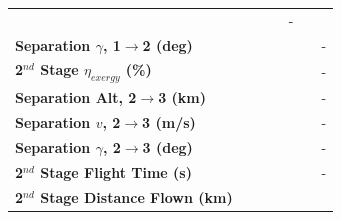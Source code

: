 \begin{table}[ht]
\begin{tabular}{l c c c c c c}
		& \firstsecondSeparationvISPThreeStandardNoReturn
		& \firstsecondSeparationvISPThreeOneHundredFiveNoReturn
		& \firstsecondSeparationvISPThreeOneHundredTenNoReturn
		& -
		\\
		\textbf{Separation $\gamma$, 1$\rightarrow$2 (deg)}
		& \firstsecondSeparationgammaISPThreeNinetyNoReturn
		& \firstsecondSeparationgammaISPThreeNinetyFiveNoReturn
		& \firstsecondSeparationgammaISPThreeStandardNoReturn
		& \firstsecondSeparationgammaISPThreeOneHundredFiveNoReturn
		& \firstsecondSeparationgammaISPThreeOneHundredTenNoReturn
		& -
		\\
		\hline 
		\textbf{2$^{nd}$ Stage $\eta_{exergy}$ (\%)}
		& \textbf{\secondExergyEffISPThreeNinetyNoReturn}
		& \textbf{\secondExergyEffISPThreeNinetyFiveNoReturn}
		& \textbf{\secondExergyEffISPThreeStandardNoReturn}
		& \textbf{\secondExergyEffISPThreeOneHundredFiveNoReturn}
		& \textbf{\secondExergyEffISPThreeOneHundredTenNoReturn}
		& -
		\\
		\textbf{Separation Alt, 2$\rightarrow$3 (km)}
		& \secondthirdSeparationAltISPThreeNinetyNoReturn
		& \secondthirdSeparationAltISPThreeNinetyFiveNoReturn
		& \secondthirdSeparationAltISPThreeStandardNoReturn
		& \secondthirdSeparationAltISPThreeOneHundredFiveNoReturn
		& \secondthirdSeparationAltISPThreeOneHundredTenNoReturn
		& -
		\\
		\textbf{Separation $v$, 2$\rightarrow$3 (m/s)}
		& \secondthirdSeparationvISPThreeNinetyNoReturn
		& \secondthirdSeparationvISPThreeNinetyFiveNoReturn
		& \secondthirdSeparationvISPThreeStandardNoReturn
		& \secondthirdSeparationvISPThreeOneHundredFiveNoReturn
		& \secondthirdSeparationvISPThreeOneHundredTenNoReturn
		& -
		\\
		\textbf{Separation $\gamma$, 2$\rightarrow$3 (deg)}
		& \secondthirdSeparationgammaISPThreeNinetyNoReturn
		& \secondthirdSeparationgammaISPThreeNinetyFiveNoReturn
		& \secondthirdSeparationgammaISPThreeStandardNoReturn
		& \secondthirdSeparationgammaISPThreeOneHundredFiveNoReturn
		& \secondthirdSeparationgammaISPThreeOneHundredTenNoReturn
		& -
		\\
		\textbf{2$^{nd}$ Stage Flight Time (s)}
		& \secondFlightTimeISPThreeNinetyNoReturn
		& \secondFlightTimeISPThreeNinetyFiveNoReturn
		& \secondFlightTimeISPThreeStandardNoReturn
		& \secondFlightTimeISPThreeOneHundredFiveNoReturn
		& \secondFlightTimeISPThreeOneHundredTenNoReturn
		& -
		\\
		\textbf{2$^{nd}$ Stage Distance Flown (km)}
		& \SecondDistISPThreeNinetyNoReturn
		& \SecondDistISPThreeNinetyFiveNoReturn

\end{tabular}
\end{table}
